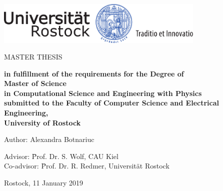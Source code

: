 \thispagestyle{empty}
\begin{center}
\vspace*{-2cm}
\includegraphics[width=0.75\textwidth]{unilogo-siegel-farbe}\\
\vspace*{3cm}
    {\titlefont \huge \onehalfspacing
	\thetitle 
    \par}
   \vfill
	\Large{\uppercase{Master Thesis}} 

\end{center}\par

\vspace{1cm}

\begin{center}
\textbf{
	in fulfillment of the requirements for the Degree of \\
	\vspace{5mm}
	{\Large Master of Science} \\
	\vspace{5mm}
	in Computational Science and Engineering with Physics \\
	submitted to the Faculty of Computer Science and Electrical Engineering, \\
	University of Rostock}
\end{center}
\vspace*{1cm}
\noindent\begin{minipage}[b]{\textwidth}
{
\noindent Author: Alexandra Botnariuc \\
\vspace*{1.5cm}

	\begin{tabbing}
	Advisor:  \= Prof. Dr. S. Wolf, CAU Kiel\\
	Co-advisor: \=  Prof. Dr. R. Redmer, Universität Rostock \\
	\end{tabbing}

  \noindent Rostock, 11 January 2019
  \par
  }
\end{minipage}


